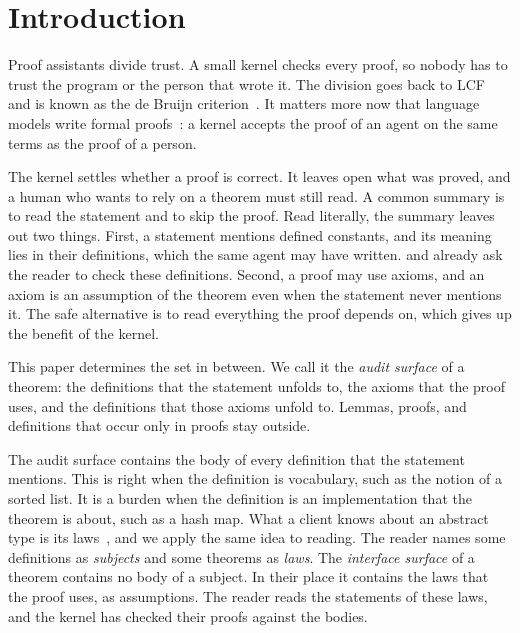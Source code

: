 \documentclass[acmsmall,nonacm,screen]{acmart}
\begin{document}
\authorsaddresses{}

\maketitle

\section{Introduction}
\label{sec:intro}

Proof assistants divide trust. A small kernel checks every proof, so nobody has to trust the
program or the person that wrote it. The division goes back to LCF~\citep{lcf1979} and is known
as the de Bruijn criterion~\citep{barendregt2005,geuvers2009}. It matters more now that language
models write formal proofs~\citep{jiang2022}: a kernel accepts the proof of an agent on the same
terms as the proof of a person.

The kernel settles whether a proof is correct. It leaves open what was proved, and a human who
wants to rely on a theorem must still read. A common summary is to read the statement and to skip
the proof. Read literally, the summary leaves out two things. First, a statement mentions defined
constants, and its meaning lies in their definitions, which the same agent may have written.
\citet{pollack1998} and \citet{adams2016} already ask the reader to check these definitions.
Second, a proof may use axioms, and an axiom is an assumption of the theorem even when the
statement never mentions it. The safe alternative is to read everything the proof depends on,
which gives up the benefit of the kernel.

This paper determines the set in between. We call it the \emph{audit surface} of a theorem: the
definitions that the statement unfolds to, the axioms that the proof uses, and the definitions
that those axioms unfold to. Lemmas, proofs, and definitions that occur only in proofs stay
outside.

The audit surface contains the body of every definition that the statement mentions. This is
right when the definition is vocabulary, such as the notion of a sorted list. It is a burden
when the definition is an implementation that the theorem is about, such as a hash map. What a
client knows about an abstract type is its laws~\citep{mitchell1988}, and we apply the same idea
to reading. The reader names some definitions as \emph{subjects} and some theorems as
\emph{laws}. The \emph{interface surface} of a theorem contains no body of a subject. In their
place it contains the laws that the proof uses, as assumptions. The reader reads the statements
of these laws, and the kernel has checked their proofs against the bodies.
\end{document}
